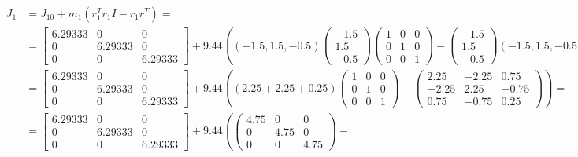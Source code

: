 \documentclass[a4paper]{article}
\begin{document}
	\begin{align*}
		J_1 &= J_{10} + m_1(r_1^Tr_1I-r_1r_1^T) =
		\\
		&= \begin{bmatrix}
			6.29333 & 0 & 0 \\
			0 & 6.29333 & 0 \\
			0 & 0 & 6.29333
		\end{bmatrix} +
		9.44
		\left(
		(-1.5, 1.5, -0.5)
		\begin{pmatrix}
			-1.5 \\ 1.5 \\ -0.5
		\end{pmatrix}
		\begin{pmatrix}
			1 & 0 & 0 \\
			0 & 1 & 0 \\
			0 & 0 & 1
		\end{pmatrix}
		-
		\begin{pmatrix}
			-1.5 \\ 1.5 \\ -0.5
		\end{pmatrix}
		(-1.5, 1.5, -0.5)
		\right) =
		\\
		&= \begin{bmatrix}
			6.29333 & 0 & 0 \\
			0 & 6.29333 & 0 \\
			0 & 0 & 6.29333
		\end{bmatrix} +
		9.44
		\left(
		(2.25 + 2.25 + 0.25)
		\begin{pmatrix}
			1 & 0 & 0 \\
			0 & 1 & 0 \\
			0 & 0 & 1
		\end{pmatrix}
		-
		\begin{pmatrix}
			 2.25 & -2.25 &  0.75 \\
			-2.25 &  2.25 & -0.75 \\
			 0.75 & -0.75 &  0.25
		\end{pmatrix}
		\right) =
		\\
		&= \begin{bmatrix}
			6.29333 & 0 & 0 \\
			0 & 6.29333 & 0 \\
			0 & 0 & 6.29333
		\end{bmatrix} +
		9.44
		\left(
		\begin{pmatrix}
			4.75 & 0 & 0 \\
			0 & 4.75 & 0 \\
			0 & 0 & 4.75
		\end{pmatrix}
		-

\end{align*}
\end{document}
